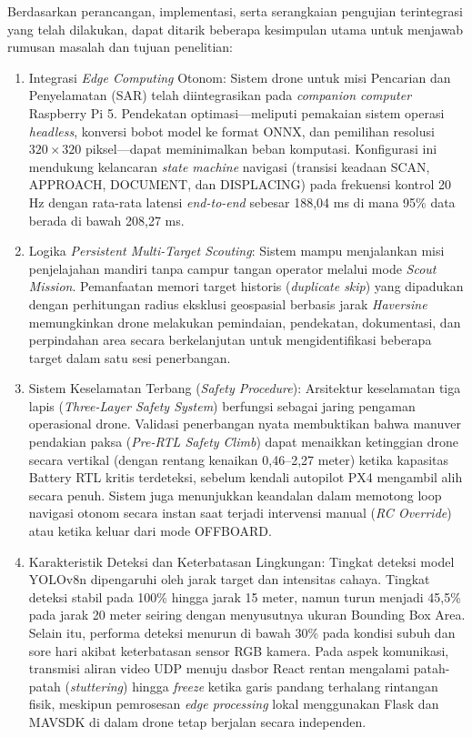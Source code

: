 Berdasarkan perancangan, implementasi, serta serangkaian pengujian terintegrasi yang telah dilakukan, dapat ditarik beberapa kesimpulan utama untuk menjawab rumusan masalah dan tujuan penelitian:
\begin{enumerate}
	\item Integrasi \textit{Edge Computing} Otonom: Sistem drone untuk misi Pencarian dan Penyelamatan (SAR) telah diintegrasikan pada \textit{companion computer} Raspberry Pi 5. Pendekatan optimasi—meliputi pemakaian sistem operasi \textit{headless}, konversi bobot model ke format ONNX, dan pemilihan resolusi $320\times320$ piksel—dapat meminimalkan beban komputasi. Konfigurasi ini mendukung kelancaran \textit{state machine} navigasi (transisi keadaan SCAN, APPROACH, DOCUMENT, dan DISPLACING) pada frekuensi kontrol 20 Hz dengan rata-rata latensi \textit{end-to-end} sebesar 188,04 ms di mana 95\% data berada di bawah 208,27 ms.
	\item Logika \textit{Persistent Multi-Target Scouting}: Sistem mampu menjalankan misi penjelajahan mandiri tanpa campur tangan operator melalui mode \textit{Scout Mission}. Pemanfaatan memori target historis (\textit{duplicate skip}) yang dipadukan dengan perhitungan radius eksklusi geospasial berbasis jarak \textit{Haversine} memungkinkan drone melakukan pemindaian, pendekatan, dokumentasi, dan perpindahan area secara berkelanjutan untuk mengidentifikasi beberapa target dalam satu sesi penerbangan.
	\item Sistem Keselamatan Terbang (\textit{Safety Procedure}): Arsitektur keselamatan tiga lapis (\textit{Three-Layer Safety System}) berfungsi sebagai jaring pengaman operasional drone. Validasi penerbangan nyata membuktikan bahwa manuver pendakian paksa (\textit{Pre-RTL Safety Climb}) dapat menaikkan ketinggian drone secara vertikal (dengan rentang kenaikan 0,46--2,27 meter) ketika kapasitas Battery RTL kritis terdeteksi, sebelum kendali autopilot PX4 mengambil alih secara penuh. Sistem juga menunjukkan keandalan dalam memotong loop navigasi otonom secara instan saat terjadi intervensi manual (\textit{RC Override}) atau ketika keluar dari mode OFFBOARD.
	\item Karakteristik Deteksi dan Keterbatasan Lingkungan: Tingkat deteksi model YOLOv8n dipengaruhi oleh jarak target dan intensitas cahaya. Tingkat deteksi stabil pada 100\% hingga jarak 15 meter, namun turun menjadi 45,5\% pada jarak 20 meter seiring dengan menyusutnya ukuran Bounding Box Area. Selain itu, performa deteksi menurun di bawah 30\% pada kondisi subuh dan sore hari akibat keterbatasan sensor RGB kamera. Pada aspek komunikasi, transmisi aliran video UDP menuju dasbor React rentan mengalami patah-patah (\textit{stuttering}) hingga \textit{freeze} ketika garis pandang terhalang rintangan fisik, meskipun pemrosesan \textit{edge processing} lokal menggunakan Flask dan MAVSDK di dalam drone tetap berjalan secara independen.
\end{enumerate}

